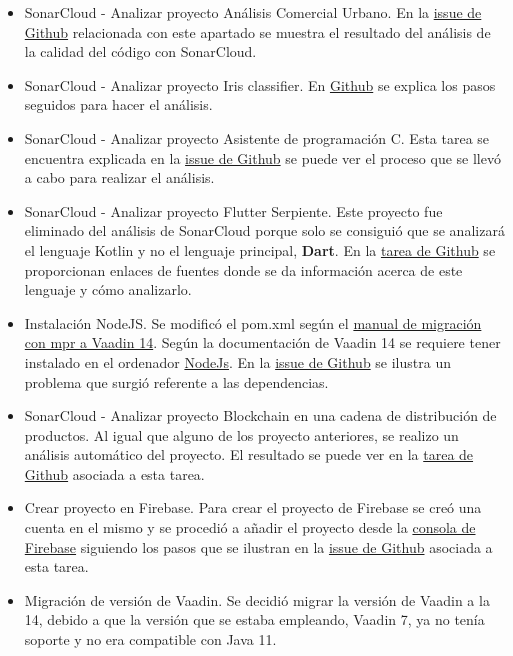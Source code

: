 \begin{itemize}
	\item SonarCloud - Analizar proyecto Análisis Comercial Urbano. 
		En la \href{https://github.com/dbo1001/Gestor-TFG-2021/issues/86}{issue de Github} relacionada con este apartado se muestra el resultado del análisis de la calidad del código con SonarCloud.
	\item SonarCloud - Analizar proyecto Iris classifier. 
		En \href{https://github.com/dbo1001/Gestor-TFG-2021/issues/92}{Github} se explica los pasos seguidos para hacer el análisis.
	\item SonarCloud - Analizar proyecto Asistente de programación C. 
		Esta tarea se encuentra explicada en la \href{https://github.com/dbo1001/Gestor-TFG-2021/issues/88}{issue de Github} se puede ver el proceso que se llevó a cabo para realizar el análisis.
	\item SonarCloud - Analizar proyecto Flutter Serpiente. 
		Este proyecto fue eliminado del análisis de SonarCloud porque solo se consiguió que se analizará el lenguaje Kotlin y no el lenguaje principal, \textbf{Dart}. En la \href{https://github.com/dbo1001/Gestor-TFG-2021/issues/89}{tarea de Github} se proporcionan enlaces de fuentes donde se da información acerca de este lenguaje y cómo analizarlo. 
	\item Instalación NodeJS. 
		Se modificó el pom.xml según el \href{https://vaadin.com/docs/v10/mpr/introduction/step-1-migration-guide}{manual de migración con mpr a Vaadin 14}. Según la documentación de Vaadin 14 se requiere tener instalado en el ordenador \href{https://nodejs.org/en/download/}{NodeJs}. En la \href{https://github.com/dbo1001/Gestor-TFG-2021/issues/97}{issue de Github} se ilustra un problema que surgió referente a las dependencias. 
	\item SonarCloud - Analizar proyecto Blockchain en una cadena de distribución de productos. 
		Al igual que alguno de los proyecto anteriores, se realizo un análisis automático del proyecto. El resultado se puede ver en la \href{https://github.com/dbo1001/Gestor-TFG-2021/issues/87}{tarea de Github} asociada a esta tarea.
	\item Crear proyecto en Firebase. 
		Para crear el proyecto de Firebase se creó una cuenta en el mismo y se procedió a añadir el proyecto desde la \href{https://console.firebase.google.com/?pli=1}{consola de Firebase} siguiendo los pasos que se ilustran en la \href{https://github.com/dbo1001/Gestor-TFG-2021/issues/98}{issue de Github} asociada a esta tarea.
	\item Migración de versión de Vaadin. 
		Se decidió migrar la versión de Vaadin a la 14, debido a que la versión que se estaba empleando, Vaadin 7, ya no tenía soporte y no era compatible con Java 11. 
		

\end{itemize}
